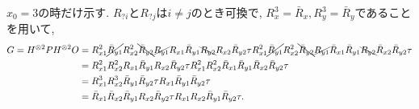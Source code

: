 \begin{ex}
    \label{ex7.50}
\end{ex}

\begin{ex}
    \label{ex7.51}
    $x_0 = 3$の時だけ示す.
    $R_{?i}$と$R_{?j}$は$i \neq j$のとき可換で, $R_x^3 = \bar{R}_x, R_y^3 = \bar{R}_y$であることを用いて,
    \begin{align*}
        G
        = H^{\otimes2} P H^{\otimes2} O
         & =
        R_{x1}^2 \cancel{\bar{R}_{y1}}R_{x2}^2 \bcancel{\bar{R}_{y2}}
        \cancel{R_{y1}}R_{x1}\bar{R}_{y1} \bcancel{R_{y2}}R_{x2}\bar{R}_{y2}\tau
        R_{x1}^2 \cancel{\bar{R}_{y1}}R_{x2}^2 \bcancel{\bar{R}_{y2}}
        \cancel{R_{y1}}\bar{R}_{x1}\bar{R}_{y1}\bcancel{R_{y2}}\bar{R}_{x2}\bar{R}_{y2} \tau
        \\
         & =
        R_{x1}^2 R_{x2}^2
        R_{x1}\bar{R}_{y1}R_{x2}\bar{R}_{y2}\tau
        R_{x1}^2 R_{x2}^2
        \bar{R}_{x1}\bar{R}_{y1}\bar{R}_{x2}\bar{R}_{y2} \tau
        \\
         & =
        R_{x1}^3 R_{x2}^3
        \bar{R}_{y1}\bar{R}_{y2}\tau
        R_{x1}
        \bar{R}_{y1}\bar{R}_{y2} \tau
        \\
         & =
        \bar{R}_{x1} \bar{R}_{x2}
        \bar{R}_{y1}R_{x2}\bar{R}_{y2}\tau
        R_{x1} R_{x2}
        \bar{R}_{y1}\bar{R}_{y2} \tau.
    \end{align*}
\end{ex}



